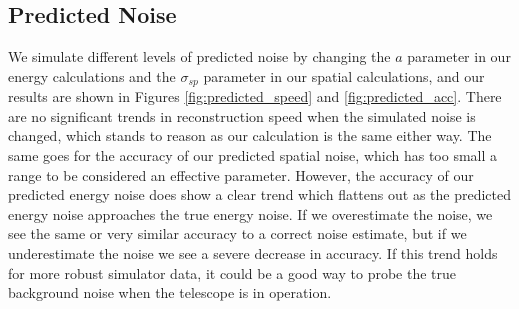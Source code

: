 \subsection{Predicted Noise}
We simulate different levels of predicted noise by changing the $a$ parameter in our energy calculations and the $\sigma_{sp}$ parameter in our spatial calculations, and our results are shown in Figures \ref{fig:predicted_speed} and \ref{fig:predicted_acc}. There are no significant trends in reconstruction speed when the simulated noise is changed, which stands to reason as our calculation is the same either way. The same goes for the accuracy of our predicted spatial noise, which has too small a range to be considered an effective parameter. However, the accuracy of our predicted energy noise does show a clear trend which flattens out as the predicted energy noise approaches the true energy noise. If we overestimate the noise, we see the same or very similar accuracy to a correct noise estimate, but if we underestimate the noise we see a severe decrease in accuracy. If this trend holds for more robust simulator data, it could be a good way to probe the true background noise when the telescope is in operation.

